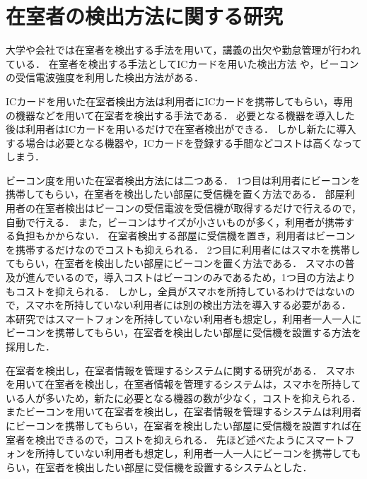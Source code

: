 \section{在室者の検出方法に関する研究}\label{2.2}
大学や会社では在室者を検出する手法を用いて，講義の出欠\cite{smartphone}\cite{nfcandroid}\cite{android}\cite{smartbase}\cite{garake}や勤怠管理\cite{amano}が行われている．
在室者を検出する手法としてICカードを用いた検出方法
\cite{zyugyou}
\cite{felica}
\cite{densi}
\cite{notouchic}
\cite{felicaweb}
\cite{suica}
や，ビーコンの受信電波強度を利用した検出方法\cite{bledakoku}\cite{blesuitei}がある．

ICカードを用いた在室者検出方法は利用者にICカードを携帯してもらい，専用の機器などを用いて在室者を検出する手法である．
必要となる機器を導入した後は利用者はICカードを用いるだけで在室者検出ができる．
しかし新たに導入する場合は必要となる機器や，ICカードを登録する手間などコストは高くなってしまう．

ビーコン度を用いた在室者検出方法には二つある．
1つ目は利用者にビーコンを携帯してもらい，在室者を検出したい部屋に受信機を置く方法である．
部屋利用者の在室者検出はビーコンの受信電波を受信機が取得するだけで行えるので，自動で行える．
また，ビーコンはサイズが小さいものが多く，利用者が携帯する負担もかからない．
在室者検出する部屋に受信機を置き，利用者はビーコンを携帯するだけなのでコストも抑えられる．
2つ目に利用者にはスマホを携帯してもらい，在室者を検出したい部屋にビーコンを置く方法である．
スマホの普及が進んでいる\cite{hukyu}ので，導入コストはビーコンのみであるため，1つ目の方法よりもコストを抑えられる．
しかし，全員がスマホを所持しているわけではないので，スマホを所持していない利用者には別の検出方法を導入する必要がある．
本研究ではスマートフォンを所持していない利用者も想定し，利用者一人一人にビーコンを携帯してもらい，在室者を検出したい部屋に受信機を設置する方法を採用した．


在室者を検出し，在室者情報を管理するシステムに関する研究がある\cite{smartphoneAndRoom}\cite{laboratory}\cite{prep}．
スマホを用いて在室者を検出し，在室者情報を管理するシステムは，スマホを所持している人が多いため，新たに必要となる機器の数が少なく，コストを抑えられる\cite{smartphoneAndRoom}．
またビーコンを用いて在室者を検出し，在室者情報を管理するシステムは利用者にビーコンを携帯してもらい，在室者を検出したい部屋に受信機を設置すれば在室者を検出できるので，コストを抑えられる\cite{laboratory}\cite{prep}．
先ほど述べたようにスマートフォンを所持していない利用者も想定し，利用者一人一人にビーコンを携帯してもらい，在室者を検出したい部屋に受信機を設置するシステムとした．

